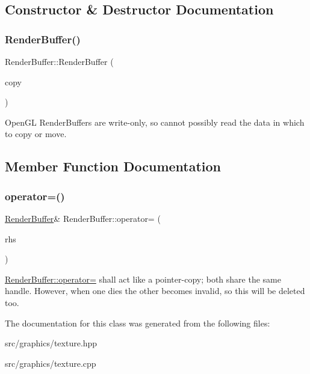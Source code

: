 \subsection{Constructor \& Destructor Documentation}
\mbox{\label{class_render_buffer_a697b503edabdcc004635382712ea3d22}} 
\subsubsection{\texorpdfstring{Render\+Buffer()}{RenderBuffer()}}
{\footnotesize\ttfamily Render\+Buffer\+::\+Render\+Buffer (\begin{DoxyParamCaption}\item[{const \mbox{\hyperlink{class_render_buffer}{Render\+Buffer}} \&}]{copy }\end{DoxyParamCaption})\hspace{0.3cm}{\ttfamily [delete]}}

Open\+GL Render\+Buffers are write-\/only, so cannot possibly read the data in which to copy or move. 

\subsection{Member Function Documentation}
\mbox{\label{class_render_buffer_a423e4e2601fdda62d63c8fc6a0bb791c}} 
\subsubsection{\texorpdfstring{operator=()}{operator=()}}
{\footnotesize\ttfamily \mbox{\hyperlink{class_render_buffer}{Render\+Buffer}}\& Render\+Buffer\+::operator= (\begin{DoxyParamCaption}\item[{const \mbox{\hyperlink{class_render_buffer}{Render\+Buffer}} \&}]{rhs }\end{DoxyParamCaption})\hspace{0.3cm}{\ttfamily [delete]}}

\mbox{\hyperlink{class_render_buffer_a423e4e2601fdda62d63c8fc6a0bb791c}{Render\+Buffer\+::operator=}} shall act like a pointer-\/copy; both share the same handle. However, when one dies the other becomes invalid, so this will be deleted too. 

The documentation for this class was generated from the following files\+:\begin{DoxyCompactItemize}
\item 
src/graphics/texture.\+hpp\item 
src/graphics/texture.\+cpp\end{DoxyCompactItemize}

